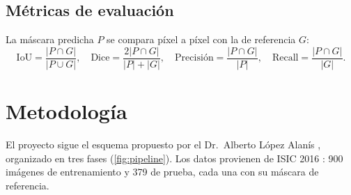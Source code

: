 \documentclass[11pt,a4paper]{article}
\begin{document}
\subsection{Métricas de evaluación}
La máscara predicha $P$ se compara píxel a píxel con la de referencia $G$:
\begin{equation}
  \mathrm{IoU} = \frac{|P\cap G|}{|P\cup G|},\quad
  \mathrm{Dice} = \frac{2|P\cap G|}{|P|+|G|},\quad
  \mathrm{Precisión} = \frac{|P\cap G|}{|P|},\quad
  \mathrm{Recall} = \frac{|P\cap G|}{|G|}.
\end{equation}

\section{Metodología}

El proyecto sigue el esquema propuesto por el Dr.\ Alberto López Alanís
\cite{lopez2023apuntes}, organizado en tres fases (\cref{fig:pipeline}).
Los datos provienen de ISIC 2016 \cite{gutman2016skin}: 900 imágenes de
entrenamiento y 379 de prueba, cada una con su máscara de referencia.
\end{document}
